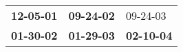 \begin{supertabular}{p{0.33\columnwidth}p{0.33\columnwidth}p{0.33\columnwidth}}
 \textbf{12-05-01\textsuperscript{}} &  \textbf{09-24-02\textsuperscript{}} &           09-24-03\textsuperscript{} \\
 \textbf{01-30-02\textsuperscript{}} &  \textbf{01-29-03\textsuperscript{}} &  \textbf{02-10-04\textsuperscript{}} \\
\end{supertabular}
